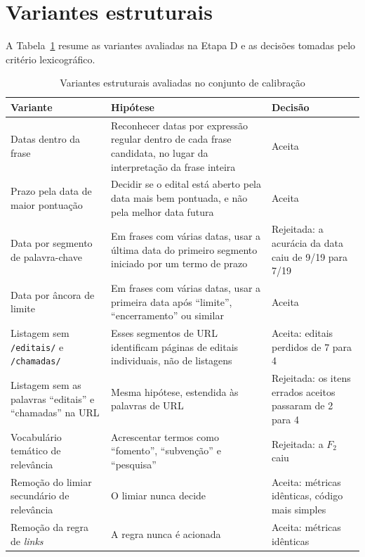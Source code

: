 \section{Variantes estruturais}
\label{sec:res_variantes}

A Tabela~\ref{tab:variantes} resume as variantes avaliadas na Etapa D e as
decisões tomadas pelo critério lexicográfico.

\begin{table}[htbp]
\centering
\caption{Variantes estruturais avaliadas no conjunto de calibração}
\label{tab:variantes}
\small
\begin{tabularx}{\textwidth}{>{\raggedright\arraybackslash}p{3.6cm} X >{\raggedright\arraybackslash}p{3.8cm}}
\toprule
Variante & Hipótese & Decisão \\
\midrule
Datas dentro da frase
  & Reconhecer datas por expressão regular dentro de cada frase candidata, no
    lugar da interpretação da frase inteira
  & Aceita \\
Prazo pela data de maior pontuação
  & Decidir se o edital está aberto pela data mais bem pontuada, e não pela
    melhor data futura
  & Aceita \\
Data por segmento de palavra-chave
  & Em frases com várias datas, usar a última data do primeiro segmento
    iniciado por um termo de prazo
  & Rejeitada: a acurácia da data caiu de 9/19 para 7/19 \\
Data por âncora de limite
  & Em frases com várias datas, usar a primeira data após ``limite'',
    ``encerramento'' ou similar
  & Aceita \\
Listagem sem \texttt{/editais/} e \texttt{/chamadas/}
  & Esses segmentos de URL identificam páginas de editais individuais, não de
    listagens
  & Aceita: editais perdidos de 7 para 4 \\
Listagem sem as palavras ``editais'' e ``chamadas'' na URL
  & Mesma hipótese, estendida às palavras de URL
  & Rejeitada: os itens errados aceitos passaram de 2 para 4 \\
Vocabulário temático de relevância
  & Acrescentar termos como ``fomento'', ``subvenção'' e ``pesquisa''
  & Rejeitada: a $F_2$ caiu \\
Remoção do limiar secundário de relevância
  & O limiar nunca decide
  & Aceita: métricas idênticas, código mais simples \\
Remoção da regra de \textit{links}
  & A regra nunca é acionada
  & Aceita: métricas idênticas \\
\bottomrule
\end{tabularx}
\end{table}

